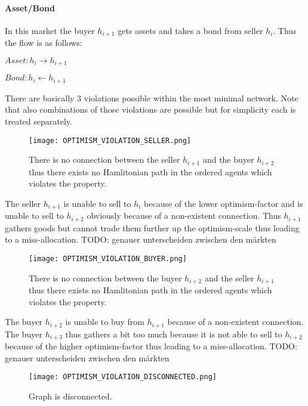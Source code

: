 \documentclass[Bachelorarbeit.tex]{subfiles}
\begin{document}
\paragraph{Asset/Bond} In this market the buyer $h_{i+1}$ gets assets and takes a bond from seller $h_i$. Thus the flow is as follows:
\begin{center}
$Asset: h_i \to h_{i+1}$
\end{center}
\begin{center}
$Bond: h_i \gets h_{i+1}$
\end{center}

\medskip

There are basically 3 violations possible within the most minimal network. Note that also combinations of those violations are possible but for simplicity each is treated separately.

\begin{figure}[H]
	\centering
  \texttt{[image: OPTIMISM\_VIOLATION\_SELLER.png]}
  	\caption{There is no connection between the seller $h_{i+1}$ and the buyer $h_{i+2}$ thus there exists no Hamlitonian path in the ordered agents which violates the property.}
	\label{fig:OPTIMISM_VIOLATION_SELLER}
\end{figure}

The seller $h_{i+1}$ is unable to sell to $h_i$ because of the lower optimism-factor and is unable to sell to $h_{i+2}$ obviously because of a non-existent connection. Thus $h_{i+1}$ gathers goods but cannot trade them further up the optimism-scale thus leading to a miss-allocation. TODO: genauer unterscheiden zwischen den märkten

\begin{figure}[H]
	\centering
  \texttt{[image: OPTIMISM\_VIOLATION\_BUYER.png]}
  	\caption{There is no connection between the buyer $h_{i+2}$ and the seller $h_{i+1}$ thus there exists no Hamlitonian path in the ordered agents which violates the property.}
	\label{fig:OPTIMISM_VIOLATION_BUYER}
\end{figure}

The buyer $h_{i+2}$ is unable to buy from $h_{i+1}$ because of a non-existent connection. The buyer $h_{i+3}$ thus gathers a bit too much because it is not able to sell to $h_{i+2}$ because of the higher optimism-factor thus leading to a miss-allocation. TODO: genauer unterscheiden zwischen den märkten

\begin{figure}[H]
	\centering
  \texttt{[image: OPTIMISM\_VIOLATION\_DISCONNECTED.png]}
  	\caption{Graph is disconnected.}
	\label{fig:OPTIMISM_VIOLATION_DISCONNECTED}
\end{figure}
\end{document}
